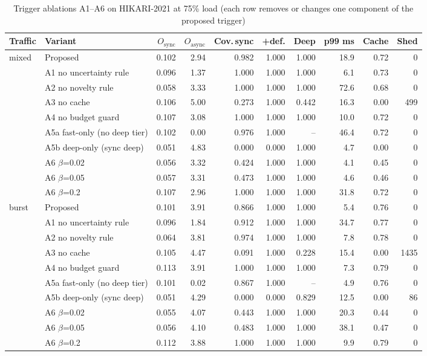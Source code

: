 \begin{table}[!htbp]
\centering
\caption{Trigger ablations A1--A6 on HIKARI-2021 at 75\% load (each row removes or changes one component of the proposed trigger)}
\label{tab:ablation:hikari_XGB_T3}
\scriptsize
\setlength{\tabcolsep}{3.5pt}
\begin{tabular}{llrrrrrrrr}
\toprule
\textbf{Traffic} & \textbf{Variant} & \textbf{$O_{\mathrm{sync}}$} & \textbf{$O_{\mathrm{async}}$} & \textbf{Cov.\,sync} & \textbf{+def.} & \textbf{Deep} & \textbf{p99 ms} & \textbf{Cache} & \textbf{Shed} \\
\midrule
mixed & Proposed & 0.102 & 2.94 & 0.982 & 1.000 & 1.000 & 18.9 & 0.72 & 0 \\
 & A1 no uncertainty rule & 0.096 & 1.37 & 1.000 & 1.000 & 1.000 & 6.1 & 0.73 & 0 \\
 & A2 no novelty rule & 0.058 & 3.33 & 1.000 & 1.000 & 1.000 & 72.6 & 0.68 & 0 \\
 & A3 no cache & 0.106 & 5.00 & 0.273 & 1.000 & 0.442 & 16.3 & 0.00 & 499 \\
 & A4 no budget guard & 0.107 & 3.08 & 1.000 & 1.000 & 1.000 & 10.0 & 0.72 & 0 \\
 & A5a fast-only (no deep tier) & 0.102 & 0.00 & 0.976 & 1.000 & -- & 46.4 & 0.72 & 0 \\
 & A5b deep-only (sync deep) & 0.051 & 4.83 & 0.000 & 0.000 & 1.000 & 4.7 & 0.00 & 0 \\
 & A6 $\beta$=0.02 & 0.056 & 3.32 & 0.424 & 1.000 & 1.000 & 4.1 & 0.45 & 0 \\
 & A6 $\beta$=0.05 & 0.057 & 3.31 & 0.473 & 1.000 & 1.000 & 4.6 & 0.46 & 0 \\
 & A6 $\beta$=0.2 & 0.107 & 2.96 & 1.000 & 1.000 & 1.000 & 31.8 & 0.72 & 0 \\
\midrule
burst & Proposed & 0.101 & 3.91 & 0.866 & 1.000 & 1.000 & 5.4 & 0.76 & 0 \\
 & A1 no uncertainty rule & 0.096 & 1.84 & 0.912 & 1.000 & 1.000 & 34.7 & 0.77 & 0 \\
 & A2 no novelty rule & 0.064 & 3.81 & 0.974 & 1.000 & 1.000 & 7.8 & 0.78 & 0 \\
 & A3 no cache & 0.105 & 4.47 & 0.091 & 1.000 & 0.228 & 15.4 & 0.00 & 1435 \\
 & A4 no budget guard & 0.113 & 3.91 & 1.000 & 1.000 & 1.000 & 7.3 & 0.79 & 0 \\
 & A5a fast-only (no deep tier) & 0.101 & 0.02 & 0.867 & 1.000 & -- & 4.9 & 0.76 & 0 \\
 & A5b deep-only (sync deep) & 0.051 & 4.29 & 0.000 & 0.000 & 0.829 & 12.5 & 0.00 & 86 \\
 & A6 $\beta$=0.02 & 0.055 & 4.07 & 0.443 & 1.000 & 1.000 & 20.3 & 0.44 & 0 \\
 & A6 $\beta$=0.05 & 0.056 & 4.10 & 0.483 & 1.000 & 1.000 & 38.1 & 0.47 & 0 \\
 & A6 $\beta$=0.2 & 0.112 & 3.88 & 1.000 & 1.000 & 1.000 & 9.9 & 0.79 & 0 \\
\bottomrule
\end{tabular}
\end{table}
